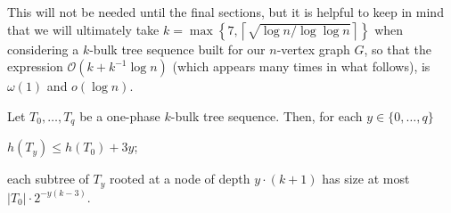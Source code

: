 \documentclass[kpfonts]{patmorin}
\newcommand{\Oh}{\mathcal{O}}
\let\le\leqslant
\begin{document}
This will not be needed until the final sections, but it is helpful to keep in mind that we will ultimately take $k=\max\left\{7,\left\lceil\sqrt{\log n / \log\log n}\right\rceil\right\}$ when considering a $k$-bulk tree sequence built for our $n$-vertex graph $G$, so that the expression $\Oh(k+k^{-1}\log n)$ (which appears many times in what follows), is $\omega(1)$ and $o(\log n)$.

\begin{lem}
Let $T_0,\dots,T_{q}$ be a one-phase $k$-bulk tree sequence.
Then, for each $y\in\{0,\dots,q\}$
\begin{compactenum}[(i)]
\item $h(T_y)\le h(T_0) + 3y$;\label{lemma-item-B1}
\item each subtree of $T_y$ rooted at a node of depth $y\cdot (k+1)$ has size at most
$|T_0|\cdot2^{-y(k-3)}$.\label{lemma-item-B2}
\end{compactenum}
\end{lem}
\end{document}

